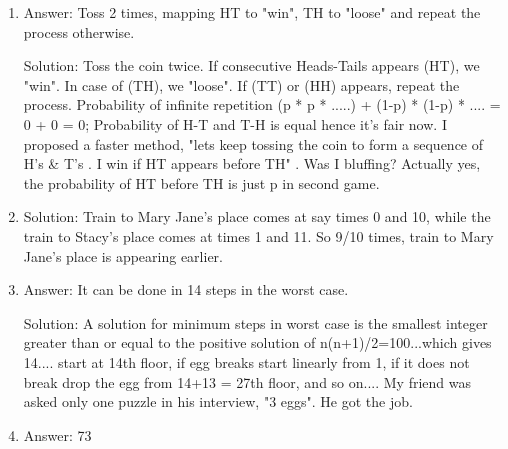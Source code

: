 \begin{enumerate}

\item
Answer: Toss 2 times, mapping HT to "win", TH to "loose" and repeat the process otherwise.
 
Solution: Toss the coin twice. If consecutive Heads-Tails appears (HT), we "win". In case of (TH), we "loose". If (TT) or (HH) appears, repeat the process. Probability of infinite repetition (p * p * .....) + (1-p) * (1-p) * .... = 0 + 0 = 0;
Probability of H-T and T-H is equal hence it's fair now.
I proposed a faster method, "lets keep tossing the coin to form a sequence of H's \& T's . I win if HT appears before TH" . Was I bluffing?
Actually yes, the probability of HT before TH is just p in second game.




\item
Solution: Train to Mary Jane's place comes at say times 0 and 10, while the train to Stacy's place comes at times 1 and 11. So 9/10 times, train to Mary Jane's place is appearing earlier.




\item
Answer: It can be done in 14 steps in the worst case.
 
Solution: A solution for minimum steps in worst case is the smallest integer greater than or equal to the positive solution of n(n+1)/2=100...which gives 14....
start at 14th floor, if egg breaks start linearly from 1, if it does not break drop the egg from 14+13 = 27th floor, and so on....
My friend was asked only one puzzle in his interview, "3 eggs". He got the job.




\item
Answer: 73
 

\end{enumerate}
